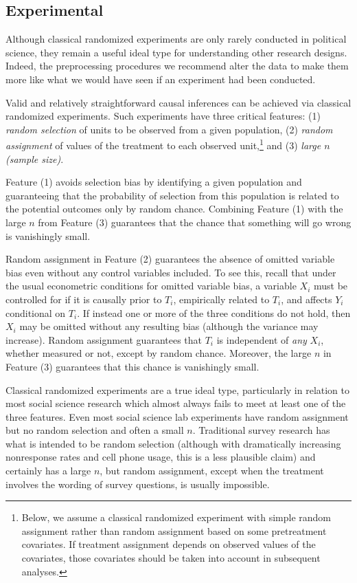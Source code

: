 \documentclass[11pt,titlepage]{article}
\begin{document}
\subsection{Experimental}

Although classical randomized experiments are only rarely conducted in
political science, they remain a useful ideal type for understanding
other research designs.  Indeed, the preprocessing procedures we
recommend alter the data to make them more like what we would have
seen if an experiment had been conducted.

Valid and relatively straightforward causal inferences can be achieved
via classical randomized experiments.  Such experiments have three
critical features: (1) \emph{random selection} of units to be observed
from a given population, (2) \emph{random assignment} of values of the
treatment to each observed unit,\footnote{Below, we assume a classical
  randomized experiment with simple random assignment rather than
  random assignment based on some pretreatment covariates.  If
  treatment assignment depends on observed values of the covariates,
  those covariates should be taken into account in subsequent analyses.}
and (3) \emph{large $n$ (sample size)}.

Feature (1) avoids selection bias by identifying a given population
and guaranteeing that the probability of selection from this
population is related to the potential outcomes only by random chance.
Combining Feature (1) with the large $n$ from Feature (3) guarantees
that the chance that something will go wrong is vanishingly small.

Random assignment in Feature (2) guarantees the absence of omitted
variable bias even without any control variables included.  To see
this, recall that under the usual econometric conditions for omitted
variable bias, a variable $X_i$ must be controlled for if it is
causally prior to $T_i$, empirically related to $T_i$, and affects
$Y_i$ conditional on $T_i$.  If instead one or more of the three
conditions do not hold, then $X_i$ may be omitted without any
resulting bias (although the variance may increase).  Random
assignment guarantees that $T_i$ is independent of \emph{any} $X_i$,
whether measured or not, except by random chance.  Moreover, the large
$n$ in Feature (3) guarantees that this chance is vanishingly small.

Classical randomized experiments are a true ideal type, particularly
in relation to most social science research which almost always fails
to meet at least one of the three features.  Even most social science
lab experiments have random assignment but no random selection and
often a small $n$.  Traditional survey research has what is intended
to be random selection (although with dramatically increasing
nonresponse rates and cell phone usage, this is a less plausible
claim) and certainly has a large $n$, but random assignment, except
when the treatment involves the wording of survey questions, is
usually impossible.
\end{document}

